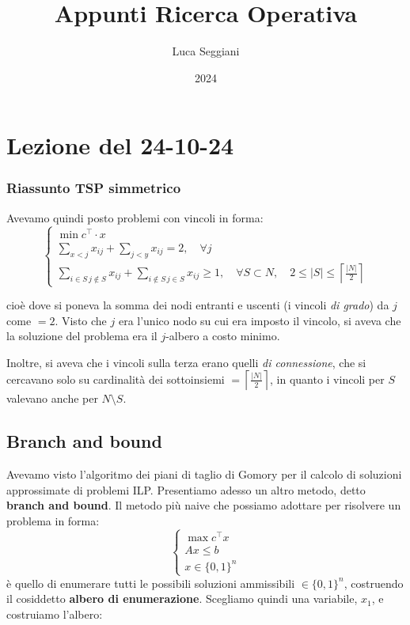 \documentclass[a4paper,11pt]{article}
\title{Appunti Ricerca Operativa}
\author{Luca Seggiani}
\date{2024}
\begin{document}
\section{Lezione del 24-10-24}

\thispagestyle{empty}
\pagestyle{fancy}

\subsubsection{Riassunto TSP simmetrico}
Avevamo quindi posto problemi con vincoli  in forma:
\[
	\begin{cases}
			\min c^\intercal \cdot x \\ 
			\sum\limits_{x < j} x_{ij} + \sum\limits_{j < y} x_{ij} = 2, \quad \forall j \\ 
			\sum\limits_{i \in S \, j \notin S} x_{ij} + \sum\limits_{i \notin S \, j \in S} x_{ij} \geq 1, \quad \forall S \subset N, \quad 2 \leq |S| \leq \left\lceil \frac{|N|}{2} \right\rceil  
	\end{cases}
\]

cioè dove si poneva la somma dei nodi entranti e uscenti (i vincoli \textit{di grado}) da $j$ come $=2$.
Visto che $j$ era l'unico nodo su cui era imposto il vincolo, si aveva che la soluzione del problema era il $j$-albero a costo minimo.

Inoltre, si aveva che i vincoli sulla terza erano quelli \textit{di connessione}, che si cercavano solo su cardinalità dei sottoinsiemi $= \left\lceil \frac{|N|}{2} \right\rceil $, in quanto i vincoli per $S$ valevano anche per $N \setminus S$.

\subsection{Branch and bound}
Avevamo visto l'algoritmo dei piani di taglio di Gomory per il calcolo di soluzioni approssimate di problemi ILP.
Presentiamo adesso un altro metodo, detto \textbf{branch and bound}.
Il metodo più naive che possiamo adottare per risolvere un problema in forma:
\[
	\begin{cases}
		\max c^\intercal x \\ 
		A x\leq b \\ 
		x \in \{0, 1\}^n
	\end{cases}
\]
è quello di enumerare tutti le possibili soluzioni ammissibili $\in \{0,1\}^n$, costruendo il cosiddetto \textbf{albero di enumerazione}.
Scegliamo quindi una variabile, $x_1$, e costruiamo l'albero:
\end{document}

